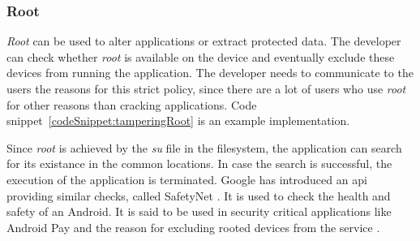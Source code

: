 \subsubsection{Root} \label{subsection:counter-improve-tampering-root}
\textit{Root} can be used to alter applications or extract protected data.
The developer can check whether \textit{root} is available on the device and eventually exclude these devices from running the application.
The developer needs to communicate to the users the reasons for this strict policy, since there are a lot of users who use \textit{root} for other reasons than cracking applications.
Code snippet~\ref{codeSnippet:tamperingRoot} is an example implementation.
\newline

Since \textit{root} is achieved by the \textit{su} file in the filesystem, the application can search for its existance in the common locations.
In case the search is successful, the execution of the application is terminated.
\newline
Google has introduced an \gls{api} providing similar checks, called SafetyNet \cite{safetynetGoogle}.
It is used to check the \grqq health and safety of an Android\grqq\cite{safetynetDev}.
It is said to be used in security critical applications like Android Pay and the reason for excluding rooted devices from the service \cite{safetynetGoogle} \cite{safetynetPay} \cite{safetynetPayx}.
